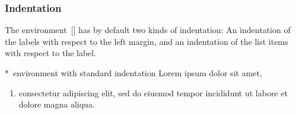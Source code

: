 \subsubsection{Indentation}
\label{list indentation with enumitem}

The environment~[\envname] has by default two kinds of indentation:
An indentation of the labels with respect to the left margin, and an indentation of the list items with respect to the label.
\begin{showlatex}*{~environment with standard indentation}
Lorem ipsum dolor sit amet,
\begin{enumerate}
  \item
  consectetur adipiscing elit, sed do eiusmod tempor incididunt ut labore et dolore magna aliqua.
\end{enumerate}
\end{showlatex}

